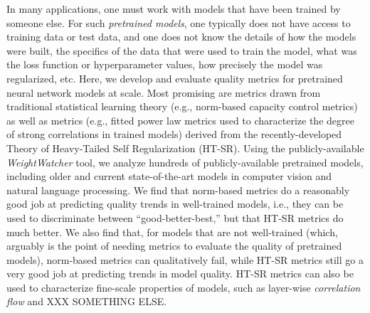 
In many applications,
one must work with models that have been trained by someone else.
For such \emph{pretrained models}, one typically does not have access to training data or test data, and one does not know the details of how the models were built, the specifics of the data that were used to train the model, what was the loss function or hyperparameter values, how precisely the model was regularized, etc.
Here, we develop and evaluate quality metrics for pretrained neural network models at scale.
Most promising are metrics drawn from traditional statistical learning theory (e.g., norm-based capacity control metrics) as well as metrics (e.g., fitted power law metrics used to characterize the degree of strong correlations in trained models) derived from the recently-developed Theory of Heavy-Tailed Self Regularization (HT-SR).
Using the publicly-available \emph{WeightWatcher} tool, we analyze hundreds of publicly-available pretrained models, including older and current state-of-the-art models in computer vision and natural language processing.
We find that norm-based metrics do a reasonably good job at predicting quality trends in well-trained models, i.e., they can be used to discriminate between ``good-better-best,'' but that HT-SR metrics do much better.
We also find that, for models that are not well-trained (which, arguably is the point of needing metrics to evaluate the quality of pretrained models), norm-based metrics can qualitatively fail, while HT-SR metrics still go a very good job at predicting trends in model quality.
HT-SR metrics can also be used to characterize fine-scale properties of models, such as layer-wise \emph{correlation flow} and XXX SOMETHING ELSE.

